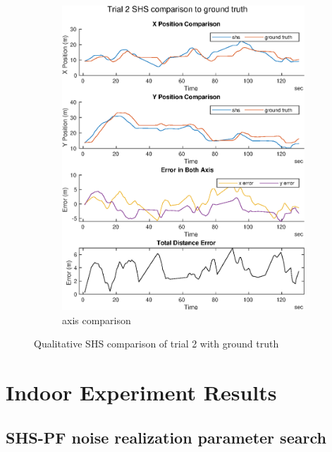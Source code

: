 \begin{figure}[H]
\begin{subfigure}[t]{.45\textwidth}
		\includegraphics[width=\linewidth]{images/20201029_1042_trial2_shs_2}
		\caption{axis comparison}
		\label{fig:trial2_comparison}
	\end{subfigure}
	\setlength{\belowcaptionskip}{-20pt}
	\caption{Qualitative SHS comparison of trial 2 with ground truth}
	\label{fig:trial2_shs_gt_comparison}
\end{figure}


\chapter{Indoor Experiment Results}

\section{SHS-PF noise realization parameter search}
\label{sec:app-shs_pf_noise_realization}

